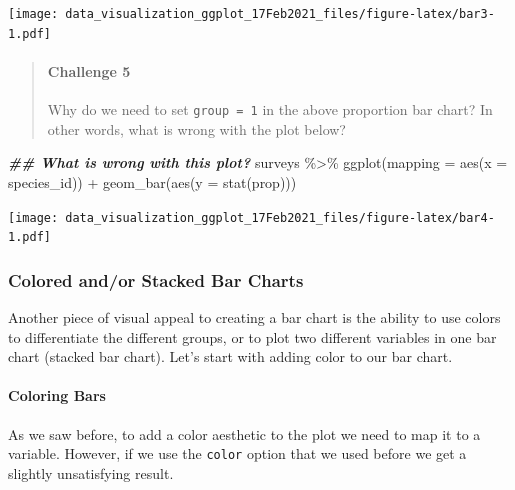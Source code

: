 \documentclass[
]{article}
\newenvironment{Shaded}{\begin{snugshade}}{\end{snugshade}}
\newcommand{\AttributeTok}[1]{\textcolor[rgb]{0.77,0.63,0.00}{#1}}
\newcommand{\DocumentationTok}[1]{\textcolor[rgb]{0.56,0.35,0.01}{\textbf{\textit{#1}}}}
\newcommand{\FunctionTok}[1]{\textcolor[rgb]{0.00,0.00,0.00}{#1}}
\newcommand{\NormalTok}[1]{#1}
\newcommand{\SpecialCharTok}[1]{\textcolor[rgb]{0.00,0.00,0.00}{#1}}
\begin{document}
\texttt{[image: data\_visualization\_ggplot\_17Feb2021\_files/figure-latex/bar3-1.pdf]}

\begin{quote}
\mbox{}%
\hypertarget{challenge-5}{%
\paragraph{Challenge 5}\label{challenge-5}}

Why do we need to set \texttt{group\ =\ 1} in the above proportion bar
chart? In other words, what is wrong with the plot below?
\end{quote}

\begin{Shaded}
\begin{Highlighting}[]
\DocumentationTok{\#\# What is wrong with this plot? }
\NormalTok{surveys }\SpecialCharTok{\%\textgreater{}\%} 
  \FunctionTok{ggplot}\NormalTok{(}\AttributeTok{mapping =} \FunctionTok{aes}\NormalTok{(}\AttributeTok{x =}\NormalTok{ species\_id)) }\SpecialCharTok{+} 
  \FunctionTok{geom\_bar}\NormalTok{(}\FunctionTok{aes}\NormalTok{(}\AttributeTok{y =} \FunctionTok{stat}\NormalTok{(prop)))}
\end{Highlighting}
\end{Shaded}

\texttt{[image: data\_visualization\_ggplot\_17Feb2021\_files/figure-latex/bar4-1.pdf]}

\hypertarget{colored-andor-stacked-bar-charts}{%
\subsubsection{Colored and/or Stacked Bar
Charts}\label{colored-andor-stacked-bar-charts}}

Another piece of visual appeal to creating a bar chart is the ability to
use colors to differentiate the different groups, or to plot two
different variables in one bar chart (stacked bar chart). Let's start
with adding color to our bar chart.

\hypertarget{coloring-bars}{%
\paragraph{Coloring Bars}\label{coloring-bars}}

As we saw before, to add a color aesthetic to the plot we need to map it
to a variable. However, if we use the \texttt{color} option that we used
before we get a slightly unsatisfying result.
\end{document}
